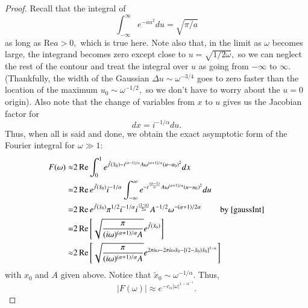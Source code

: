 \begin{proof}
Recall that the integral of 
\begin{equation}\label{gaussInt}
\int_{-\infty}^{\infty} e^{-a u^{2}} d u=\sqrt{\pi / a}
\end{equation}
as long as Re$a>0,$ which is true here. Note also that, in the limit as $\omega $ becomes large, the integrand becomes zero except close to $u=\sqrt{1 / 2 \omega },$ so we can neglect the rest of the contour and treat the integral over $u$ as going from $-\infty$ to $\infty$. (Thankfully, the width of the Gaussian $\Delta u \sim \omega ^{-3 / 4}$ goes to zero faster than the location of the maximum $u_{0} \sim \omega ^{-1 / 2},$ so we don't have to worry about the $u=0$ origin). Also note that the change of variables from $x$ to $u$ gives us the Jacobian factor for 
$$dx=i^{-1 / \alpha}d u.$$ 
Thus, when all is said and done, we obtain the exact asymptotic form of the Fourier integral for $\omega  \gg 1$: 
\begin{equation}
\begin{split}
F(\omega ) \approx &2 \operatorname{Re}\int_{0}^{1} e^{\tilde f(\tilde x_0) - i^{(\alpha-1) / \alpha} A \omega ^{(\alpha+1) / \alpha}\left(u-u_{0}\right)^{2}} dx
\\
=&2 \operatorname{Re} e^{\tilde f(\tilde x_0)} i^{-1 / \alpha} \int_{-\infty}^{\infty} e^{- i^{(\alpha-1) \over  \alpha} A \omega ^{(\alpha+1) / \alpha}\left(u-u_{0}\right)^{2}} du
\\
=&2 \operatorname{Re} e^{\tilde f(\tilde x_0)} \pi^{1/2}i^{-1 / \alpha}  i^{(1-\alpha) \over  2\alpha} A^{-1/2} \omega ^{-(\alpha+1) / 2\alpha}\qquad \text{ by \eqref{gaussInt}} 
\\
=&2 \operatorname{Re}\left[\sqrt{\frac{\pi}{(i \omega )^{(\alpha+1) / \alpha} A}} e^{\tilde f(\tilde x_0)}\right]
\\
\approx &2 \operatorname{Re}\left[\sqrt{\frac{\pi}{(i \omega )^{(\alpha+1) / \alpha} A}} e^{ 2\pi i \omega - 2\pi i \omega  \tilde x_{0}- \left[\left(2-\tilde x_{0}\right) \tilde x_{0}\right]^{1-\alpha}}\right]
\end{split}
\end{equation}  
with $x_{0}$ and $A$ given above.  Notice that $ \tilde x_0\sim \omega ^{-1 / \alpha}$. Thus,
$$
|F(\omega ) | \approx  e^{-c_\alpha|\omega |^{1-\alpha^{-1}}}.
$$
\end{proof}